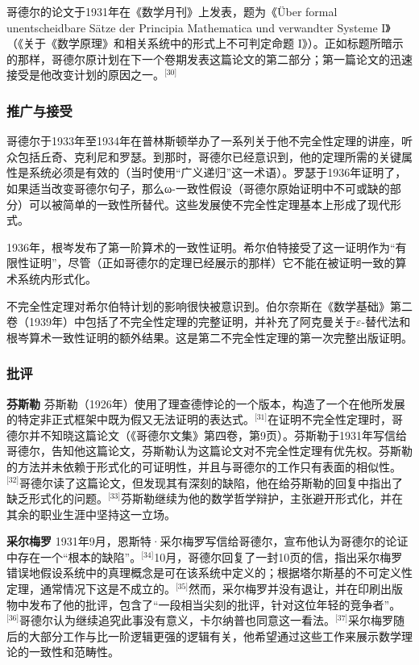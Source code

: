 哥德尔的论文于1931年在《数学月刊》上发表，题为《Über formal unentscheidbare Sätze der Principia Mathematica und verwandter Systeme I》（《关于《数学原理》和相关系统中的形式上不可判定命题 I》）。正如标题所暗示的那样，哥德尔原计划在下一个卷期发表这篇论文的第二部分；第一篇论文的迅速接受是他改变计划的原因之一。\(^\text{[30]}\)
\subsubsection{推广与接受}  
哥德尔于1933年至1934年在普林斯顿举办了一系列关于他不完全性定理的讲座，听众包括丘奇、克利尼和罗瑟。到那时，哥德尔已经意识到，他的定理所需的关键属性是系统必须是有效的（当时使用“广义递归”这一术语）。罗瑟于1936年证明了，如果适当改变哥德尔句子，那么ω-一致性假设（哥德尔原始证明中不可或缺的部分）可以被简单的一致性所替代。这些发展使不完全性定理基本上形成了现代形式。

1936年，根岑发布了第一阶算术的一致性证明。希尔伯特接受了这一证明作为“有限性证明”，尽管（正如哥德尔的定理已经展示的那样）它不能在被证明一致的算术系统内形式化。

不完全性定理对希尔伯特计划的影响很快被意识到。伯尔奈斯在《数学基础》第二卷（1939年）中包括了不完全性定理的完整证明，并补充了阿克曼关于\(\varepsilon\)-替代法和根岑算术一致性证明的额外结果。这是第二不完全性定理的第一次完整出版证明。
\subsubsection{批评}
\textbf{芬斯勒}  
芬斯勒（1926年）使用了理查德悖论的一个版本，构造了一个在他所发展的特定非正式框架中既为假又无法证明的表达式。\(^\text{[31]}\)在证明不完全性定理时，哥德尔并不知晓这篇论文（《哥德尔文集》第四卷，第9页）。芬斯勒于1931年写信给哥德尔，告知他这篇论文，芬斯勒认为这篇论文对不完全性定理有优先权。芬斯勒的方法并未依赖于形式化的可证明性，并且与哥德尔的工作只有表面的相似性。\(^\text{[32]}\)哥德尔读了这篇论文，但发现其有深刻的缺陷，他在给芬斯勒的回复中指出了缺乏形式化的问题。\(^\text{[33]}\)芬斯勒继续为他的数学哲学辩护，主张避开形式化，并在其余的职业生涯中坚持这一立场。

\textbf{采尔梅罗}  
1931年9月，恩斯特·采尔梅罗写信给哥德尔，宣布他认为哥德尔的论证中存在一个“根本的缺陷”。\(^\text{[34]}\)10月，哥德尔回复了一封10页的信，指出采尔梅罗错误地假设系统中的真理概念是可在该系统中定义的；根据塔尔斯基的不可定义性定理，通常情况下这是不成立的。\(^\text{[35]}\)然而，采尔梅罗并没有退让，并在印刷出版物中发布了他的批评，包含了“一段相当尖刻的批评，针对这位年轻的竞争者”。\(^\text{[36]}\)哥德尔认为继续追究此事没有意义，卡尔纳普也同意这一看法。\(^\text{[37]}\)采尔梅罗随后的大部分工作与比一阶逻辑更强的逻辑有关，他希望通过这些工作来展示数学理论的一致性和范畴性。

